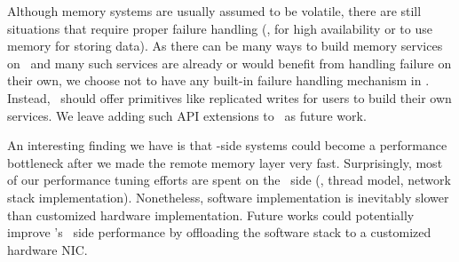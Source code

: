 Although memory systems are usually assumed to be volatile, %
there are still situations that require proper failure handling (\eg, for high availability or to use memory for storing data).
As there can be many ways to build memory services on \sys\ 
and many such services are already or would benefit from handling failure on their own,
we choose not to have any built-in failure handling mechanism in \sys.
Instead, \sys\ should offer primitives like replicated writes for users to build their own services.
We leave adding such API extensions to \sys\ as future work.

An interesting finding we have is that \CN-side systems
could become a performance bottleneck after we made the remote memory layer very fast.
Surprisingly, most of our performance tuning efforts are spent on the \CN\ side (\eg, thread model, network stack implementation).
Nonetheless, software implementation is inevitably slower than customized hardware implementation.
Future works could potentially improve \sys's \CN\ side performance by offloading the software stack to a customized hardware NIC.

